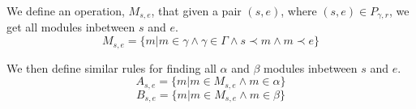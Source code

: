 We define an operation, $M_{s,e}$, that given a pair $(s, e)$, where $(s, e) \in P_{\gamma ,r}$, we get all modules inbetween $s$ and $e$.
\[M_{s,e} = \{m | m \in \gamma \land \gamma \in \Gamma \land s \prec m \land m \prec e\}\]

We then define similar rules for finding all $\alpha$ and $\beta$ modules inbetween $s$ and $e$.
\[A_{s,e} = \{m |m \in M_{s,e} \land m \in \alpha\}\]
\[B_{s,e} = \{m |m \in M_{s,e} \land m \in \beta\}\]






















